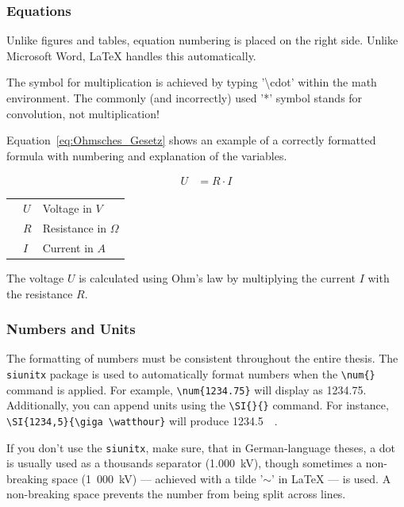 \subsubsection{Equations}
\label{sec:equations}

Unlike figures and tables, equation numbering is placed on the right side. Unlike Microsoft Word, LaTeX handles this automatically.

The symbol for multiplication is achieved by typing '\textbackslash cdot' within the math environment. The commonly (and incorrectly) used '*' symbol stands for convolution, not multiplication!

Equation~\ref{eq:Ohmsches_Gesetz} shows an example of a correctly formatted formula with numbering and explanation of the variables.

\begin{align}
	\label{eq:Ohmsches_Gesetz}
	U &= R \cdot I
\end{align}
\vspace*{-1cm}
\begin{table}[H]
	\begin{tabular}{@{}p{1cm}@{}p{1cm}<{\dotfill}@{}p{\dimexpr\linewidth-5cm}}
		& $U$ & Voltage in $V$  \\
		& $R$ & Resistance in $\Omega$ \\
		& $I$ & Current in $A$ 
	\end{tabular}
\end{table}

The voltage $U$ is calculated using Ohm’s law by multiplying the current $I$ with the resistance $R$.


\subsubsection{Numbers and Units}
\label{sec:numbersAndUnits}

The formatting of numbers must be consistent throughout the entire thesis. The \texttt{siunitx} package is used to automatically format numbers when the \verb|\num{}| command is applied. For example, \verb|\num{1234.75}| will display as \num{1234.75}. Additionally, you can append units using the \verb|\SI{}{}| command. For instance, \verb|\SI{1234,5}{\giga \watthour}| will produce \SI{1234,5}{\giga\watthour}.

If you don't use the \texttt{siunitx}, make sure, that in German-language theses, a dot is usually used as a thousands separator (1.000~kV), though sometimes a non-breaking space (1~000~kV) — achieved with a tilde '$\sim$' in LaTeX — is used. A non-breaking space prevents the number from being split across lines.


